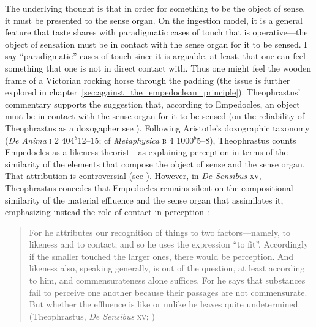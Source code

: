 The underlying thought is that in order for something to be the object of sense, it must be presented to the sense organ. On the ingestion model, it is a general feature that taste shares with paradigmatic cases of touch that is operative---the object of sensation must be in contact with the sense organ for it to be sensed. I say ``paradigmatic'' cases of touch since it is arguable, at least, that one can feel something that one is not in direct contact with. Thus one might feel the wooden frame of a Victorian rocking horse through the padding (the issue is further explored in chapter~\ref{sec:against_the_empedoclean_principle}). Theophrastus' commentary supports the suggestion that, according to Empedocles, an object must be in contact with the sense organ for it to be sensed (on the reliability of Theophrastus as a doxogapher see \citealt{Kahn:1994qf,Baltussen:2000aa}). Following Aristotle's doxographic taxonomy (\emph{De Anima} \textsc{i} 2 404\( ^{b} \)12--15; cf \emph{Metaphysica} \textsc{b} 4 1000\( ^{b} \)5--8), Theophrastus counts Empedocles as a likeness theorist---as explaining perception in terms of the similarity of the elements that compose the object of sense and the sense organ. That attribution is controversial (see \citealt{Kamtekar:2009fk}). However, in \emph{De Sensibus} \textsc{xv}, Theophrastus concedes that Empedocles remains silent on the compositional similarity of the material effluence and the sense organ that assimilates it, emphasizing instead the role of contact in perception \citep{Kamtekar:2009fk,Sedley:1992uq}:
\begin{quote}
	For he attributes our recognition of things to two factors---namely, to likeness and to contact; and so he uses the expression ``to fit''. Accordingly if the smaller touched the larger ones, there would be perception. And likeness also, speaking generally, is out of the question, at least according to him, and commensurateness alone suffices. For he says that substances fail to perceive one another because their passages are not commensurate. But whether the effluence is like or unlike he leaves quite undetermined. (Theophrastus, \emph{De Sensibus} \textsc{xv}; \citealt[79]{Stratton:1917vn})
\end{quote}

